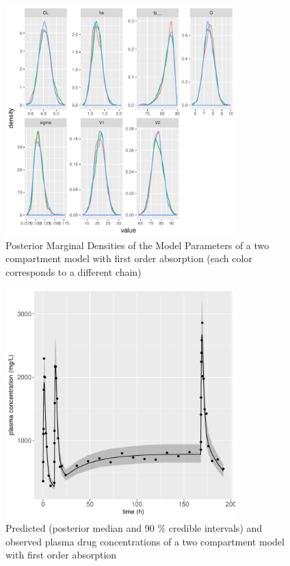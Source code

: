 \documentclass[11pt]{amsart}
\begin{document}
\begin{figure}[!htb]
\begin{center}
\includegraphics[width=3.5in,trim=0in 0in 0 0in]{graphics/TwoCptModelPlots003.pdf}
\caption{{Posterior Marginal Densities of the Model Parameters of a two compartment model with first order absorption (each color corresponds to a different chain)}}
\label{TwoCptDensity}
\end{center}
\end{figure}

\begin{figure}[!htb]
\begin{center}
\includegraphics[width=3.5in,trim=0in 0in 0 0in]{graphics/TwoCptModelPlots006.pdf}
\caption{{Predicted (posterior median and 90 \% credible intervals) and observed plasma drug concentrations of a two compartment model with first order absorption}}
\label{TwoCptPredictions}
\end{center}
\end{figure}
\end{document}

